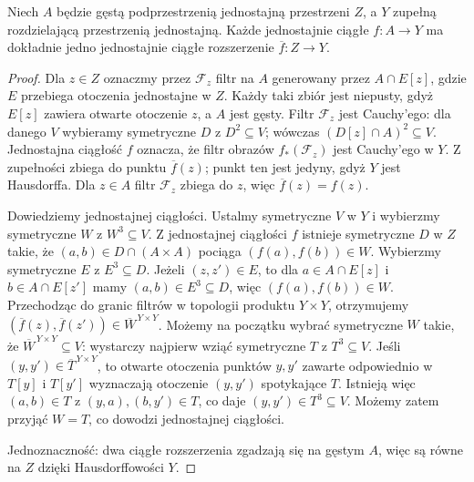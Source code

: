 \begin{lemat}
\label{lem:topog-uzupelnienia-rozszerzenie}
Niech $A$ będzie gęstą podprzestrzenią
jednostajną przestrzeni $Z$, a $Y$ zupełną
rozdzielającą przestrzenią jednostajną.
Każde jednostajnie ciągłe
$f:A\to Y$ ma dokładnie jedno
jednostajnie ciągłe rozszerzenie
$\overline f:Z\to Y$.
\end{lemat}
\begin{proof}
Dla $z\in Z$ oznaczmy przez $\mathcal F_z$
filtr na $A$ generowany przez
$A\cap E[z]$, gdzie $E$ przebiega
otoczenia jednostajne w $Z$.
Każdy taki zbiór jest niepusty,
gdyż $E[z]$ zawiera otwarte otoczenie
$z$, a $A$ jest gęsty. Filtr
$\mathcal F_z$ jest Cauchy'ego:
dla danego $V$ wybieramy symetryczne
$D$ z $D^2\subseteq V$;
wówczas $(D[z]\cap A)^2\subseteq V$.
Jednostajna ciągłość $f$ oznacza,
że filtr obrazów $f_*(\mathcal F_z)$
jest Cauchy'ego w $Y$. Z zupełności
zbiega do punktu $\overline f(z)$;
punkt ten jest jedyny, gdyż $Y$
jest Hausdorffa. Dla $z\in A$
filtr $\mathcal F_z$ zbiega do $z$,
więc $\overline f(z)=f(z)$.

Dowiedziemy jednostajnej ciągłości.
Ustalmy symetryczne $V$ w $Y$ i wybierzmy
symetryczne $W$ z $W^3\subseteq V$.
Z jednostajnej ciągłości $f$ istnieje
symetryczne $D$ w $Z$ takie, że
$(a,b)\in D\cap(A\times A)$ pociąga
$(f(a),f(b))\in W$.
Wybierzmy symetryczne $E$ z $E^3\subseteq D$.
Jeżeli $(z,z')\in E$, to dla
$a\in A\cap E[z]$ i $b\in A\cap E[z']$
mamy $(a,b)\in E^3\subseteq D$,
więc $(f(a),f(b))\in W$.
Przechodząc do granic filtrów w
topologii produktu $Y\times Y$,
otrzymujemy
$(\overline f(z),\overline f(z'))\in
\overline W^{\,Y\times Y}$.
Możemy na początku wybrać symetryczne $W$
takie, że $\overline W^{\,Y\times Y}\subseteq V$:
wystarczy najpierw wziąć symetryczne $T$
z $T^3\subseteq V$.
Jeśli $(y,y')\in\overline T^{\,Y\times Y}$,
to otwarte otoczenia punktów $y,y'$
zawarte odpowiednio w $T[y]$ i $T[y']$
wyznaczają otoczenie $(y,y')$ spotykające $T$.
Istnieją więc $(a,b)\in T$ z
$(y,a),(b,y')\in T$, co daje
$(y,y')\in T^3\subseteq V$.
Możemy zatem przyjąć $W=T$,
co dowodzi jednostajnej ciągłości.

Jednoznaczność: dwa ciągłe rozszerzenia
zgadzają się na gęstym $A$, więc
są równe na $Z$ dzięki Hausdorffowości $Y$.
\end{proof}

